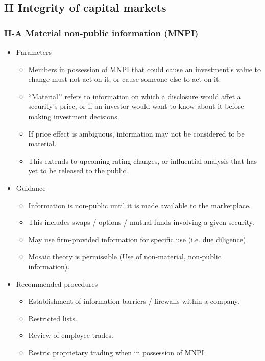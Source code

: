 \documentclass[../notes_compiled.tex]{subfiles}
\begin{document}
\subsection{II Integrity of capital markets}
\subsubsection{II-A Material non-public information (MNPI)}
\begin{itemize}
\item Parameters
\begin{itemize}
\item Members in possession of MNPI that could cause an investment’s value to change must not act on it, or cause someone else to act on it.
\item ``Material’’ refers to information on which a disclosure would affet a security’s price, or if an investor would want to know about it before making investment decisions.
\item If price effect is ambiguous, information may not be considered to be material.
\item This extends to upcoming rating changes, or influential analysis that has yet to be released to the public.
\end{itemize}
\item Guidance
\begin{itemize}
\item Information is non-public until it is made available to the marketplace.
\item This includes swaps / options / mutual funds involving a given security.
\item May use firm-provided information for specific use (i.e. due diligence).
\item Mosaic theory is permissible (Use of non-material, non-public information).
\end{itemize}
\item Recommended procedures
\begin{itemize}
\item Establishment of information barriers / firewalls within a company.
\item Restricted lists.
\item Review of employee trades.
\item Restric proprietary trading when in possession of MNPI.
\end{itemize}
\end{itemize}
\end{document}
